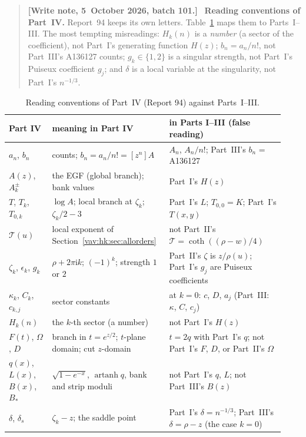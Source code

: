 \documentclass[11pt]{article}
\theoremstyle{remark}\newtheorem{remark}[theorem]{Remark}
\newcommand{\ii}{\mathrm i}
\newenvironment{writenoteb}{\begin{quote}\small\raggedright\textbf{[Write note, 5~October 2026, batch 101.]}\ }{\end{quote}}
\begin{document}
\begin{writenoteb}
\textbf{Reading conventions of Part~IV.} Report~94 keeps its own letters.
Table~\ref{vav:hk:tab:notation} maps them to Parts~I--III. The most
tempting misreadings: $H_k(n)$ is a \emph{number} (a sector of the
coefficient), not Part~I's generating function $H(z)$; $b_n=a_n/n!$, not
Part~III's A136127 counts; $g_k\in\{1,2\}$ is a singular strength, not
Part~I's Puiseux coefficient $g_j$; and $\delta$ is a local variable at the
singularity, not Part~I's $n^{-1/3}$.
\end{writenoteb}
\begin{table}[H]
\centering\small
\caption{Reading conventions of Part~IV (Report 94) against Parts~I--III.}
\label{vav:hk:tab:notation}
\begin{tabular}{@{}>{\raggedright}p{0.15\linewidth}>{\raggedright}p{0.38\linewidth}>{\raggedright\arraybackslash}p{0.40\linewidth}@{}}
\toprule
Part IV & meaning in Part IV & in Parts I--III (false reading)\\\midrule
$a_n$, $b_n$ & counts; $b_n=a_n/n!=[z^n]A$ & $A_n$, $A_n/n!$; Part~III's $b_n$ = A136127\\
$A(z)$, $A_k^\pm$ & the EGF (global branch); bank values & Part~I's $H(z)$\\
$T$, $T_k$, $T_{0,k}$ & $\log A$; local branch at $\zeta_k$; $\zeta_k/2-3$ & Part~I's $L$; $T_{0,0}=K$; Part~I's $T(x,y)$\\
$\mathcal T(u)$ & local exponent of Section~\ref{vav:hk:sec:allorders} & not Part~II's $\mathcal T=\coth((\rho-w)/4)$\\
$\zeta_k$, $\epsilon_k$, $g_k$ & $\rho+2\pi\ii k$; $(-1)^k$; strength $1$ or $2$ & Part~II's $\zeta$ is $z/\rho(u)$; Part~I's $g_j$ are Puiseux coefficients\\
$\kappa_k$, $C_k$, $c_{k,j}$ & sector constants & at $k=0$: $c$, $D$, $a_j$ (Part~III: $\kappa$, $C$, $c_j$)\\
$H_k(n)$ & the $k$-th sector (a number) & not Part~I's $H(z)$\\
$F(t)$, $\Omega$, $D$ & branch in $t=e^{z/2}$; $t$-plane domain; cut $z$-domain & $t=2q$ with Part~I's $q$; not Part~I's $F$, $D$, or Part~II's $\Omega$\\
$q(x)$, $L(x)$, $B(x)$, $B_*$ & $\sqrt{1-e^{-x}}$, $\operatorname{artanh}q$, bank and strip moduli & not Part~I's $q$, $L$; not Part~III's $B(z)$\\
$\delta$, $\delta_s$ & $\zeta_k-z$; the saddle point & Part~I's $\delta=n^{-1/3}$; Part~III's $\delta=\rho-z$ (the case $k=0$)\\

\end{tabular}
\end{table}
\end{document}
